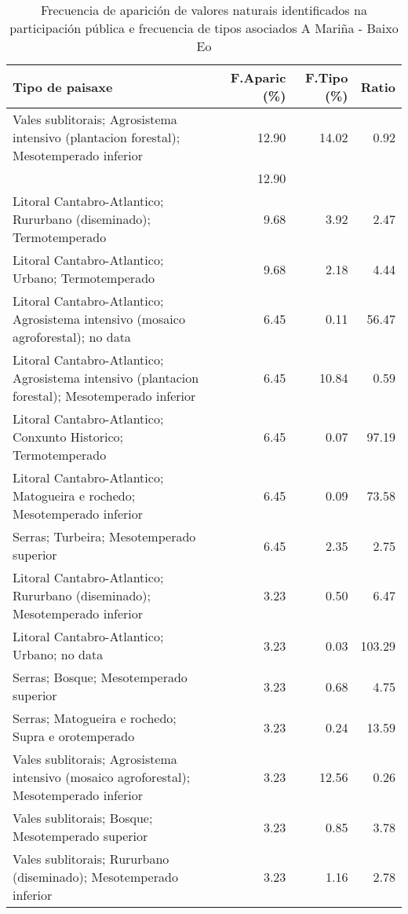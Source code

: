 \begin{table}[p]
\centering
\caption{Frecuencia de aparición de valores naturais identificados na participación pública e frecuencia de tipos asociados A Mariña - Baixo Eo} 
\label{vsixotnat2}
\begin{tabular}{lrrr}
  \hline
Tipo de paisaxe & F.Aparic (\%) & F.Tipo (\%) & Ratio \\ 
  \hline
Vales sublitorais; Agrosistema intensivo (plantacion forestal); Mesotemperado inferior & 12.90 & 14.02 & 0.92 \\ 
   & 12.90 &  &  \\ 
  Litoral Cantabro-Atlantico; Rururbano (diseminado); Termotemperado & 9.68 & 3.92 & 2.47 \\ 
  Litoral Cantabro-Atlantico; Urbano; Termotemperado & 9.68 & 2.18 & 4.44 \\ 
  Litoral Cantabro-Atlantico; Agrosistema intensivo (mosaico agroforestal); no data & 6.45 & 0.11 & 56.47 \\ 
  Litoral Cantabro-Atlantico; Agrosistema intensivo (plantacion forestal); Mesotemperado inferior & 6.45 & 10.84 & 0.59 \\ 
  Litoral Cantabro-Atlantico; Conxunto Historico; Termotemperado & 6.45 & 0.07 & 97.19 \\ 
  Litoral Cantabro-Atlantico; Matogueira e rochedo; Mesotemperado inferior & 6.45 & 0.09 & 73.58 \\ 
  Serras; Turbeira; Mesotemperado superior & 6.45 & 2.35 & 2.75 \\ 
  Litoral Cantabro-Atlantico; Rururbano (diseminado); Mesotemperado inferior & 3.23 & 0.50 & 6.47 \\ 
  Litoral Cantabro-Atlantico; Urbano; no data & 3.23 & 0.03 & 103.29 \\ 
  Serras; Bosque; Mesotemperado superior & 3.23 & 0.68 & 4.75 \\ 
  Serras; Matogueira e rochedo; Supra e orotemperado & 3.23 & 0.24 & 13.59 \\ 
  Vales sublitorais; Agrosistema intensivo (mosaico agroforestal); Mesotemperado inferior & 3.23 & 12.56 & 0.26 \\ 
  Vales sublitorais; Bosque; Mesotemperado superior & 3.23 & 0.85 & 3.78 \\ 
  Vales sublitorais; Rururbano (diseminado); Mesotemperado inferior & 3.23 & 1.16 & 2.78 \\ 
   \hline
\end{tabular}
\end{table}
